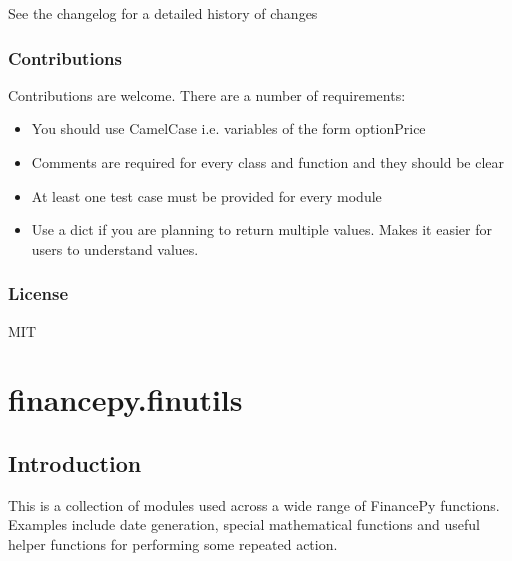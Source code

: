 \documentclass[twoside,11pt]{book}
\begin{document}
See the changelog for a detailed history of changes


\subsection*{Contributions}

Contributions are welcome. There are a number of requirements:

\begin{itemize}
\item{ You should use CamelCase i.e. variables of the form optionPrice
}
\item{ Comments are required for every class and function and they should be clear
}
\item{ At least one test case must be provided for every module
}
\item{ Use a dict if you are planning to return multiple values. Makes it easier for users to understand values.
}
\end{itemize}


\subsection*{License}

MIT

\chapter{financepy.finutils}
\section{Introduction}

This is a collection of modules used across a wide range of FinancePy functions. Examples include date generation, special mathematical functions and useful helper functions for performing some repeated action.
\end{document}
